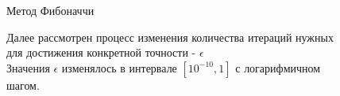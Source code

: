 \documentclass[11pt]{article}
\begin{document}
\begin{figure}[h]
\begin{minipage}[h]{0.47\linewidth}
             Метод Фибоначчи \\
        \end{minipage}
        \caption{Далее рассмотрен процесс изменения количества итераций нужных для достижения конкретной точности - $\epsilon$ \\
            Значения $\epsilon$ изменялось в интервале $[10^{-10}, 1]$ с логарифмичном шагом.}
    \end{figure}
\end{document}
